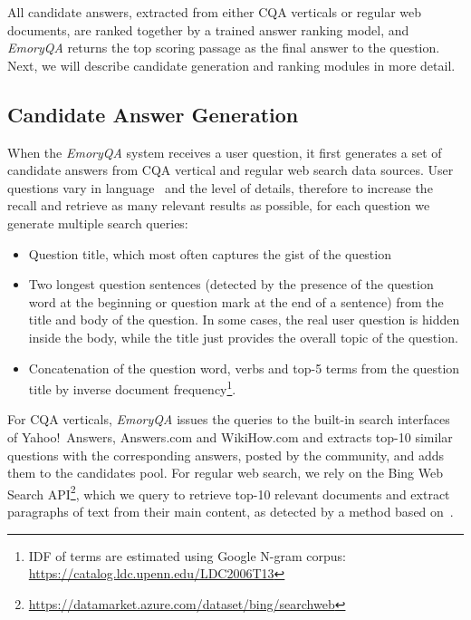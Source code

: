 All candidate answers, extracted from either CQA verticals or regular web documents, are ranked together by a trained answer ranking model, and \textit{EmoryQA} returns the top scoring passage as the final answer to the question.
Next, we will describe candidate generation and ranking modules in more detail.

\subsection{Candidate Answer Generation}
\label{section:non-factoid:system:candidates}

When the \textit{EmoryQA} system receives a user question, it first generates a set of candidate answers from CQA vertical and regular web search data sources.
User questions vary in language~\cite{AgichteinLG01} and the level of details, therefore to increase the recall and retrieve as many relevant results as possible, for each question we generate multiple search queries:
\begin{itemize}[itemsep=0em]
\item Question title, which most often captures the gist of the question
\item Two longest question sentences (detected by the presence of the question word at the beginning or question mark at the end of a sentence) from the title and body of the question. In some cases, the real user question is hidden inside the body, while the title just provides the overall topic of the question.
\item Concatenation of the question word, verbs and top-5 terms from the question title by inverse document frequency\footnote{IDF of terms are estimated using Google N-gram corpus: \href{url}{https://catalog.ldc.upenn.edu/LDC2006T13}}.
\end{itemize}

For CQA verticals, \textit{EmoryQA} issues the queries to the built-in search interfaces of Yahoo!~Answers, Answers.com and WikiHow.com and extracts top-10 similar questions with the corresponding answers, posted by the community, and adds them to the candidates pool.
For regular web search, we rely on the Bing Web Search API\footnote{\href{url}{https://datamarket.azure.com/dataset/bing/searchweb}}, which we query to retrieve top-10 relevant documents and extract paragraphs of text from their main content, as detected by a method based on~\cite{Kohlschutter_2010}.

